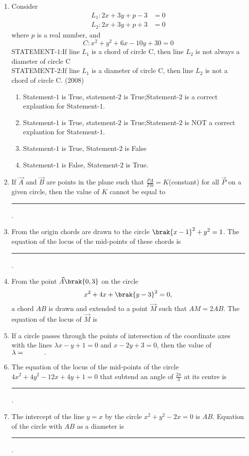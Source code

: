 	\begin{enumerate}
\item Consider 
\begin{align*}
	L_1:2x+3y+p-3&=0
	\\
               L_2:2x+3y+p+3&=0
\end{align*}
where $p$ is a real number, and 
		$$	C: x^2+y^2+6x-10y+30=0$$
STATEMENT-$1$:If line $L_1$ is a chord of circle C, then line $L_2$ is not always a diameter of circle C\\
STATEMENT-$2$:If line $L_1$ is a diameter of circle C, then line $L_2$ is not a chord  of circle C. \hfill(2008)
\begin{enumerate}
\item Statement-$1$ is True, statement-$2$ is True;Statement-$2$ is a correct explantion for Statement-$1$.
\item Statement-$1$ is True, statement-$2$ is True;Statement-$2$ is NOT a correct explantion for Statement-$1$.
\item Statement-$1$ is True, Statement-$2$ is False
\item Statement-$1$ is False, Statement-$2$ is True.	
\end{enumerate}
	\item If $\vec{A}$ and $\vec{B}$ are points in the plane such that  $\frac{PA}{PB}=K$(constant) for all $\vec{P}$ on a given circle,  then the value of $K$ cannot be equal to \rule{1cm}{0.01pt}.
		\hfill{}
\item From the origin chords are drawn  to the circle $\brak{x-1}^{2}+y^{2}=1$. The equation of the locus of the mid-points of these chords is
\rule{1cm}{0.01pt}.
	\hfill{}
\item From the point $\vec{A}\brak{0, 3}$ on the circle $$x^{2}+4x+\brak{y-3}^{2}=0,$$  a chord $AB$ is drawn and extended to a point $\vec{M}$ such that $AM=2AB$. The equation of the locus of $\vec{M}$ is 
%
	\hfill{}
\item If a circle passes through the points of intersection of the coordinate axes with the lines $\lambda x-y+1=0$ and $x-2y+3=0$,  then the value of $\lambda =\rule{1cm}{0.01pt}.$
%
	\hfill{}
\item The equation of the locus of the mid-points of the circle $4x^{2}+4y^{2}-12x+4y+1=0$ that subtend an angle of $\frac{2\pi}{3}$ at its centre is \rule{1cm}{0.01pt}.
%
	\hfill{}
\item The intercept of the line $y=x$ by the circle $x^{2}+y^{2}-2x=0$ is $AB$. Equation of the circle with $AB$ as a diameter is \rule{1cm}{0.01pt}.

\end{enumerate}
